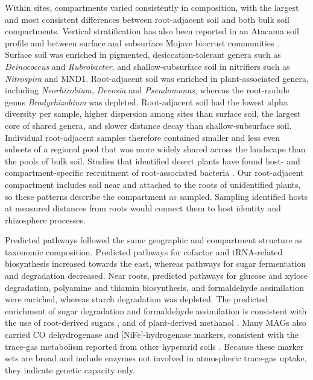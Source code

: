 \documentclass[fleqn,10pt,numbers]{olplainarticle}
\begin{document}
Within sites, compartments varied consistently in composition, with the largest and most consistent differences between root-adjacent soil and both bulk soil compartments. Vertical stratification has also been reported in an Atacama soil profile and between surface and subsurface Mojave biocrust communities \cite{horstmann2024atacama,pombubpa2020mojave}. Surface soil was enriched in pigmented, desiccation-tolerant genera such as \textit{Deinococcus} and \textit{Rubrobacter}, and shallow-subsurface soil in nitrifiers such as \textit{Nitrospira} and MND1. Root-adjacent soil was enriched in plant-associated genera, including  \textit{Neorhizobium}, \textit{Devosia} and \textit{Pseudomonas}, whereas the root-nodule genus \textit{Bradyrhizobium} was depleted. Root-adjacent soil had the lowest alpha diversity per sample, higher dispersion among sites than surface soil, the largest core of shared genera, and slower distance decay than shallow-subsurface soil. Individual root-adjacent samples therefore contained smaller and less even subsets of a regional pool that was more widely shared across the landscape than the pools of bulk soil. Studies that identified desert plants have found host- and compartment-specific recruitment of root-associated bacteria \cite{philippot2013roots,eida2018desertplants,marasco2022namib,maurice2024alula}. Our root-adjacent compartment includes soil near and attached to the roots of unidentified plants, so these patterns describe the compartment as sampled. Sampling identified hosts at measured distances from roots would connect them to host identity and rhizosphere processes.

Predicted pathways followed the same geographic and compartment structure as taxonomic composition. Predicted pathways for cofactor and tRNA-related biosynthesis increased towards the east, whereas pathways for sugar fermentation and degradation decreased. Near roots, predicted pathways for glucose and xylose degradation, polyamine and thiamin biosynthesis, and formaldehyde assimilation were enriched, whereas starch degradation was depleted. The predicted enrichment of sugar degradation and formaldehyde assimilation is consistent with the use of root-derived sugars \cite{sugarrhizosphere}, and of plant-derived methanol \cite{macey2020impact}. Many MAGs also carried CO dehydrogenase and [NiFe]-hydrogenase markers, consistent with the trace-gas metabolism reported from other hyperarid soils \cite{leung2020energetic}. Because these marker sets are broad and include enzymes not involved in atmospheric trace-gas uptake, they indicate genetic capacity only.
\end{document}
